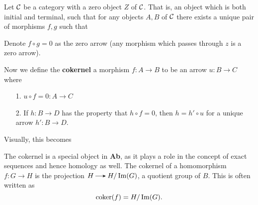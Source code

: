     \begin{definition}
    Let $\mathcal{C}$ be a category with a zero object $Z$ of $\mathcal{C}$. That
    is, an object which is both initial and terminal, such that
    for any objects $A, B$ of $\mathcal{C}$ there exists a unique pair of
    morphisms $f, g$
    such that 
    \begin{center}
    \end{center}
    Denote $f \circ g = 0$ as the zero arrow (any morphism which
    passes through $z$ is a zero arrow).

    Now we define the \textbf{cokernel} a morphism $f: A \to B$ to
    be an arrow $u:B \to C$ where 
    \begin{itemize}
        \item[1.] $u \circ f = 0: A \to C$ 
        \item[2.] If $h: B \to D$ has the property that $h \circ f
        = 0$, then $h = h' \circ u$ for a unique arrow $h': B \to
        D$.
    \end{itemize}
    Visually, this becomes 
    \begin{center}
    \end{center}    
    \end{definition}    
    The cokernel is a special object in \textbf{Ab}, as it plays a
    role in the concept of exact sequences and hence homology as
    well. The cokernel of a homomorphism $f: G \to H$ is the
    projection $H \to H/\im(G)$, a quotient group of $B$. This is
    often written as 
    \[
        \text{coker}(f) = H/\operatorname{\rm{Im}}(G).
    \]

